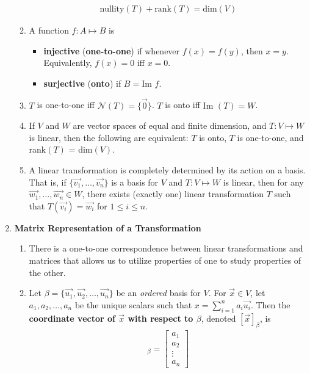 \documentclass[10pt]{article}
\begin{document}
\begin{multicols*}{2}
\begin{enumerate}
\begin{enumerate}
        \begin{align*}
            \text{nullity}(T) + \text{rank}(T) = \text{dim}(V)
        \end{align*}
        \item A function $f: A \mapsto B$ is
        \begin{itemize}
            \item \textbf{injective} (\textbf{one-to-one}) if whenever $f(x) = f(y)$, then $x=y$. Equivalently, $f(x) = 0$ iff $x=0$.
            \item \textbf{surjective} (\textbf{onto}) if $B = \text{Im } f$.
        \end{itemize}
        \item $T$ is one-to-one iff $\mathcal{N}(T) = \{ \vec{0} \}$. $T$ is onto iff $\text{Im }(T) = W$.
        \item If $V$ and $W$ are vector spaces of equal and finite dimension, and $T: V \mapsto W$ is linear, then the following are equivalent: $T$ is onto, $T$ is one-to-one, and rank$(T)$ = dim$(V)$.
        \item A linear transformation is completely determined by its action on a basis. That is, if $\{\vec{v_1},\hdots,\vec{v_n}\}$ is a basis for $V$ and $T : V \mapsto W$ is linear, then for any $\vec{w_1},\hdots,\vec{w_n} \in W$, there exists (exactly one) linear transformation $T$ such that $T(\vec{v_i}) = \vec{w_i}$ for $1 \leq i \leq n$. 
    \end{enumerate}
    
    \columnbreak
    \item \textbf{Matrix Representation of a Transformation}
    \begin{enumerate}
        \item There is a one-to-one correspondence between linear transformations and matrices that allows us to utilize properties of one to study properties of the other.
        \item Let $\beta = \{ \vec{u_1}, \vec{u_2}, \hdots, \vec{u_n} \}$ be an \textit{ordered} basis for $V$. For $\vec{x} \in V$, let $a_1, a_2, \hdots, a_n$ be the unique scalars such that $x = \sum_{i=1}^{n} a_i \vec{u_i}$. Then the \textbf{coordinate vector of $\vec{x}$ with respect to $\beta$}, denoted $[\vec{x}]_\beta$, is
        \begin{align*}
            [\vec{x}]_\beta = 
            \begin{bmatrix} a_1 \\ a_2 \\ \vdots \\ a_n \end{bmatrix}
        \end{align*}
        

\end{enumerate}
\end{enumerate}
\end{multicols*}
\end{document}

